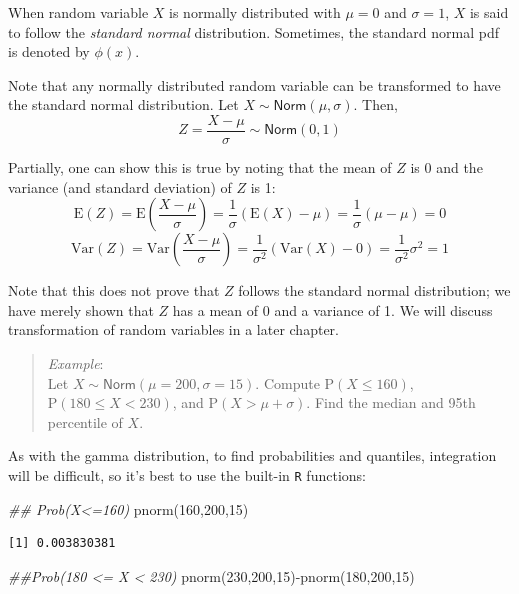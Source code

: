 \documentclass[
  letterpaper,
  DIV=11,
  numbers=noendperiod]{scrreprt}
\newenvironment{Shaded}{\begin{snugshade}}{\end{snugshade}}
\newcommand{\DecValTok}[1]{\textcolor[rgb]{0.68,0.00,0.00}{#1}}
\newcommand{\DocumentationTok}[1]{\textcolor[rgb]{0.37,0.37,0.37}{\textit{#1}}}
\newcommand{\FunctionTok}[1]{\textcolor[rgb]{0.28,0.35,0.67}{#1}}
\newcommand{\NormalTok}[1]{\textcolor[rgb]{0.00,0.23,0.31}{#1}}
\newcommand{\SpecialCharTok}[1]{\textcolor[rgb]{0.37,0.37,0.37}{#1}}
\begin{document}
When random variable \(X\) is normally distributed with \(\mu=0\) and
\(\sigma=1\), \(X\) is said to follow the \emph{standard normal}
distribution. Sometimes, the standard normal pdf is denoted by
\(\phi(x)\).

Note that any normally distributed random variable can be transformed to
have the standard normal distribution. Let
\(X \sim \textsf{Norm}(\mu,\sigma)\). Then, \[
Z=\frac{X-\mu}{\sigma} \sim \textsf{Norm}(0,1)
\]

Partially, one can show this is true by noting that the mean of \(Z\) is
0 and the variance (and standard deviation) of \(Z\) is 1: \[
\mbox{E}(Z)=\mbox{E}\left(\frac{X-\mu}{\sigma}\right)=\frac{1}{\sigma}\left(\mbox{E}(X)-\mu\right)=\frac{1}\sigma(\mu-\mu)=0
\] \[
\mbox{Var}(Z)=\mbox{Var}\left(\frac{X-\mu}{\sigma}\right)=\frac{1}{\sigma^2}\left(\mbox{Var}(X)-0\right)=\frac{1}{\sigma^2} \sigma^2=1
\]

Note that this does not prove that \(Z\) follows the standard normal
distribution; we have merely shown that \(Z\) has a mean of 0 and a
variance of 1. We will discuss transformation of random variables in a
later chapter.

\begin{quote}
\emph{Example}:\\
Let \(X \sim \textsf{Norm}(\mu=200,\sigma=15)\). Compute
\(\mbox{P}(X\leq 160)\), \(\mbox{P}(180\leq X < 230)\), and
\(\mbox{P}(X>\mu+\sigma)\). Find the median and 95th percentile of
\(X\).
\end{quote}

As with the gamma distribution, to find probabilities and quantiles,
integration will be difficult, so it's best to use the built-in
\texttt{R} functions:

\begin{Shaded}
\begin{Highlighting}[]
\DocumentationTok{\#\# Prob(X\textless{}=160)}
\FunctionTok{pnorm}\NormalTok{(}\DecValTok{160}\NormalTok{,}\DecValTok{200}\NormalTok{,}\DecValTok{15}\NormalTok{)}
\end{Highlighting}
\end{Shaded}

\begin{verbatim}
[1] 0.003830381
\end{verbatim}

\begin{Shaded}
\begin{Highlighting}[]
\DocumentationTok{\#\#Prob(180 \textless{}= X \textless{} 230)}
\FunctionTok{pnorm}\NormalTok{(}\DecValTok{230}\NormalTok{,}\DecValTok{200}\NormalTok{,}\DecValTok{15}\NormalTok{)}\SpecialCharTok{{-}}\FunctionTok{pnorm}\NormalTok{(}\DecValTok{180}\NormalTok{,}\DecValTok{200}\NormalTok{,}\DecValTok{15}\NormalTok{)}
\end{Highlighting}
\end{Shaded}
\end{document}
